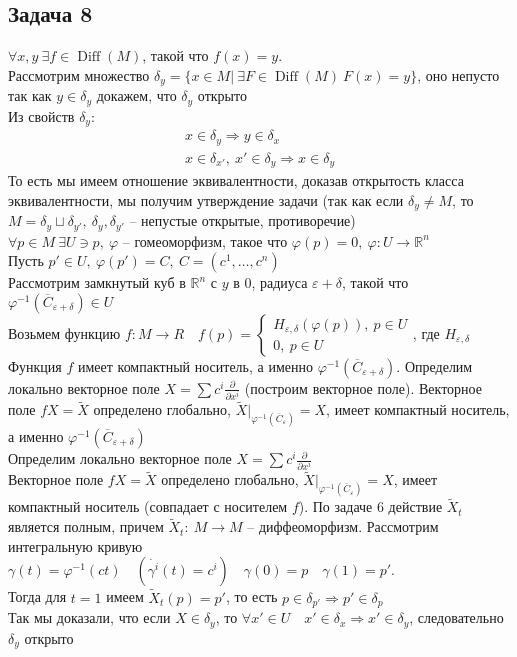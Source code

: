 \subsection*{Задача 8}
	$\forall x,y\ \exists f \in \operatorname{Diff}(M)$, такой что $f(x) = y$.\\
	Рассмотрим множество $\delta_y = \{x \in M|\ \exists F \in \operatorname{Diff}(M)\ F(x) = y\}$, оно непусто так как $y \in \delta_y$ докажем, что $\delta_y$ открыто\\
	Из свойств $\delta_y$:
	\begin{gather*}
		x \in \delta_y \Rightarrow y \in \delta_x\\
		x \in \delta_{x'},\ x' \in \delta_y \Rightarrow x \in \delta_{y}
	\end{gather*}
	То есть мы имеем отношение эквивалентности, доказав открытость класса эквивалентности, мы получим утверждение задачи (так как если $\delta_y \ne M$, то $M = \delta_y \sqcup \delta_{y'},\ \delta_y, \delta_{y'}$ -- непустые открытые, противоречие)\\
	$\forall p \in M\ \exists U \ni p,\ \varphi$ -- гомеоморфизм, такое что $\varphi(p) = 0,\ \varphi: U \to \mathbb{R}^n$\\
	Пусть $p' \in U,\ \varphi(p') = C,\ C = (c^{1}, \ldots, c^{n})$\\
	Рассмотрим замкнутый куб в $\mathbb{R}^n$ с $y$ в $0$, радиуса $\varepsilon + \delta$, такой что $\varphi^{-1}(\overline{C}_{\varepsilon+\delta}) \in U$\\
	Возьмем функцию $f: M \to R\quad f(p) =
	\begin{cases}
		H_{\varepsilon, \delta}(\varphi(p)),\ p \in U\\
		0,\ p \in U
	\end{cases}
	$, где $H_{\varepsilon, \delta}$\\
	Функция $f$ имеет компактный носитель, а именно $\varphi^{-1}(\overline{C}_{\varepsilon + \delta})$. Определим локально векторное поле $X = \sum c^{i} \frac{\partial }{\partial x^{i}}$ (построим векторное поле). Векторное поле $f X = \tilde{X}$ определено глобально, $\tilde{X}|_{\varphi^{-1}(\overline{C}_{\varepsilon})} = X$, имеет компактный носитель, а именно $\varphi^{-1}(\overline{C}_{\varepsilon + \delta})$\\
	Определим локально векторное поле $X = \sum c^{i} \frac{\partial }{\partial x^{i}}$\\
	Векторное поле $f X = \tilde{X}$ определено глобально, $\tilde{X}|_{\varphi^{-1}(\overline{C}_{\varepsilon})} = X$, имеет компактный носитель (совпадает с носителем $f$). По задаче 6 действие $\tilde{X}_t$ является полным, причем $\tilde{X}_t:\ M \to M$ -- диффеоморфизм. Рассмотрим интегральную кривую $\gamma(t) = \varphi^{-1}(ct)\quad (\dot{\gamma^{i}}(t) = c^{i})\quad \gamma(0) = p\quad \gamma(1) = p'$.\\
	Тогда для $t = 1$ имеем $\tilde{X}_t(p) = p'$, то есть $p \in \delta_{p'} \Rightarrow p' \in \delta_{p}$\\
	Так мы доказали, что если $X \in \delta_{y}$, то $\forall x' \in U\quad x' \in \delta_x \Rightarrow x' \in \delta_y$, следовательно $\delta_y$ открыто